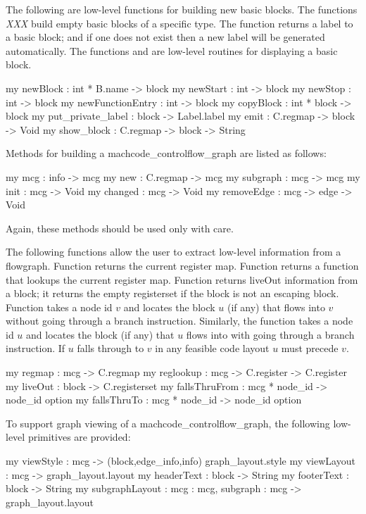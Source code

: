     The following are low-level functions for building new basic blocks.
The functions \emph{XXX} build empty basic blocks of a specific
type.  The function  returns a label to a basic block;
and if one does not exist then a new label will be generated automatically.
The functions  and  are low-level
routines for displaying a basic block.
\begin{SML}
   my newBlock          : int * B.name -> block      
   my newStart          : int -> block              
   my newStop           : int -> block             
   my newFunctionEntry  : int -> block            
   my copyBlock         : int * block -> block   
   my put_private_label       : block -> Label.label  
   my emit              : C.regmap -> block -> Void
   my show_block        : C.regmap -> block -> String 
\end{SML}

   Methods for building a machcode_controlflow_graph are listed as follows:
\begin{SML}
   my mcg      : info -> mcg    
   my new      : C.regmap -> mcg
   my subgraph : mcg -> mcg     
   my init     : mcg -> Void    
   my changed  : mcg -> Void   
   my removeEdge : mcg -> edge -> Void
\end{SML}
 Again, these methods should be used only with care.

  The following functions allow the user to extract low-level information
from a flowgraph.  Function  returns the current register map.
Function  returns a function that lookups the current register
map.  Function  returns liveOut information from a block;
it returns the empty registerset if the block is not an escaping block.
Function  takes a node id $v$ and locates the
block $u$ (if any) that flows into $v$ without going through a branch
instruction.  Similarly, the function   takes
a node id $u$ and locates the block (if any) that $u$ flows into
with going through a branch instruction.  If $u$ falls through to
$v$ in any feasible code layout $u$ must precede $v$.
\begin{SML}
   my regmap    : mcg -> C.regmap
   my reglookup : mcg -> C.register -> C.register
   my liveOut   : block -> C.registerset
   my fallsThruFrom : mcg * node_id -> node_id option
   my fallsThruTo   : mcg * node_id -> node_id option
\end{SML}

   To support graph viewing of a machcode_controlflow_graph, the following low-level
primitives are provided: 
\begin{SML}
   my viewStyle      : mcg -> (block,edge_info,info) graph_layout.style
   my viewLayout     : mcg -> graph_layout.layout
   my headerText     : block -> String
   my footerText     : block -> String
   my subgraphLayout : { mcg : mcg, subgraph : mcg } -> graph_layout.layout
\end{SML}

